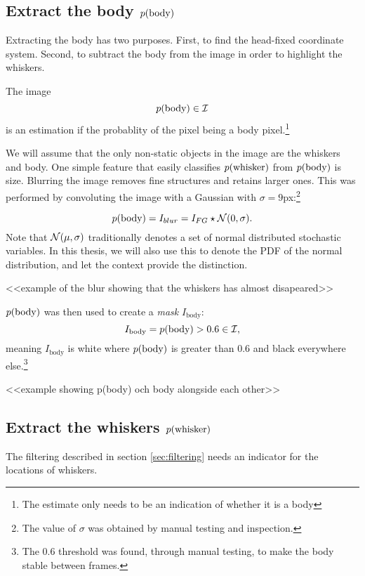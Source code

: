 \subsection{Extract the body $p{(\text{body})}$}
\label{sec:findbody}
Extracting the body has two purposes. First, to find the head-fixed
coordinate system. Second, to subtract the body from the image in
order to highlight the whiskers.

\begin{definition}
  The image
  \begin{equation}
    p{(\text{body})}\in \mathcal{I}
  \end{equation} is an estimation if the probablity of the pixel
  being a body pixel.\footnote{The estimate only needs to
    be an indication of whether it is a body}
\end{definition}

We will assume that the only non-static objects in the image are the
whiskers and body. One simple feature that easily classifies
$p{(\text{whisker})}$ from $p{(\text{body})}$ is size. Blurring
the image removes fine structures and retains larger ones.  This was
performed by convoluting the image with a Gaussian with
${\sigma=9}$px:\footnote{The value of $\sigma$ was obtained by manual
  testing and inspection.}

\begin{equation}
  p{(\text{body})} = I_{blur} = I_{FG} \star \mathcal{N}{\left(0, \sigma\right)}.
\end{equation}
Note that $\mathcal{N}{\left(\mu, \sigma\right)}$ traditionally denotes a set of normal
distributed stochastic variables. In this thesis, we will also use
this to denote the PDF of the normal distribution, and let the context
provide the distinction.

<<example of the blur showing that the whiskers has almost disapeared>>

$p{(\text{body})}$ was then used to create a \emph{mask} $I_{\text{body}}$:
\begin{equation}
  I_{\text{body}} = p{(\text{body})}>0.6 \in \mathcal{I},
\end{equation}
meaning $I_{\text{body}}$ is white where $p{(\text{body})}$ is greater than
0.6 and black everywhere else.\footnote{The 0.6 threshold was found,
  through manual testing, to make the body stable between frames.}

<<example showing p(body) och body alongside each other>>

\subsection{Extract the whiskers $p{(\text{whisker})}$}
\label{sec:findwhisker}
The filtering described in section \ref{sec:filtering} needs an
indicator for the locations of whiskers.

